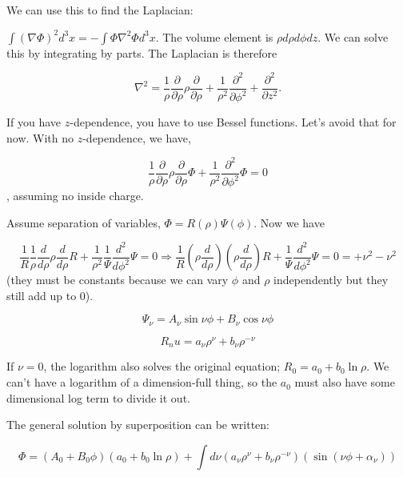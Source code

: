 \documentclass[a4paper,twoside,master.tex]{subfiles}
\begin{document}
We can use this to find the Laplacian:

$\int(\nabla\Phi)^2d^3x = -\int\Phi\nabla^2\Phi d^3x$. The volume element is $\rho d\rho d\phi dz$. We can solve this by integrating by parts. The Laplacian is therefore

\begin{equation}
   \nabla^2 = \frac{1}{\rho}\frac{\partial}{\partial\rho}\rho\frac{\partial}{\partial\rho} + \frac{1}{\rho^2}\frac{\partial^2}{\partial\phi^2}+\frac{\partial^2}{\partial z^2}.
\end{equation}

If you have $z$-dependence, you have to use Bessel functions. Let's avoid that for now. With no $z$-dependence, we have,

\begin{equation} \frac{1}{\rho}\frac{\partial}{\partial\rho}\rho\frac{\partial}{\partial\rho}\Phi + \frac{1}{\rho^2}\frac{\partial^2}{\partial\phi^2}\Phi = 0
\end{equation}, assuming no inside charge.

Assume separation of variables, $\Phi = R(\rho)\Psi(\phi)$. Now we have

\begin{equation}
     \frac{1}{R}\frac{1}{\rho}\frac{d}{d\rho}\rho\frac{d}{d\rho} R + \frac{1}{\rho^2}\frac{1}{\Psi}\frac{d^2}{d\phi^2}\Psi = 0\Rightarrow\frac{1}{R}\left(\rho\frac{d}{d\rho}\right)\left(\rho\frac{d}{d\rho}\right)R + \frac{1}{\Psi}\frac{d^2}{d\phi^2}\Psi = 0 = +\nu^2 -\nu^2
\end{equation}
(they must be constants because we can vary $\phi$ and $\rho$ independently but they still add up to 0).

\begin{equation}
   \Psi_\nu = A_\nu\sin\nu\phi+B_\nu\cos\nu\phi
\end{equation}

\begin{equation}
   R_nu = a_\nu\rho^\nu + b_\nu\rho^{-\nu}
\end{equation}

If $\nu = 0$, the logarithm also solves the original equation; $R_0 = a_0 + b_0\ln\rho$. We can't have a logarithm of a dimension-full thing, so the $a_0$ must also have some dimensional log term to divide it out.

The general solution by superposition can be written:

\begin{equation}
   \Phi = (A_0+B_0\phi)(a_0+b_0\ln\rho)+\int d\nu(a_\nu\rho^\nu + b_\nu\rho^{-\nu})(\sin(\nu\phi+\alpha_\nu))
\end{equation}
\end{document}
